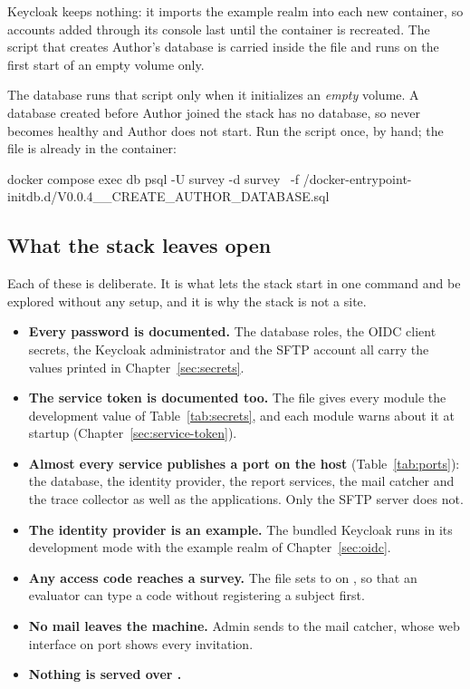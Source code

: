 \documentclass[11pt, a4paper]{article}
\begin{document}
Keycloak keeps nothing: it imports the example realm into each new container, so accounts
added through its console last until the container is recreated. The script that creates
Author's  database is carried inside the file and runs on the first start of an
empty  volume only.

\begin{elicitcaution}
The database runs that script only when it initializes an \emph{empty} volume. A database
created before Author joined the stack has no  database, so 
never becomes healthy and Author does not start. Run the script once, by hand; the file is
already in the container:

\begin{elicitcmd}
docker compose exec db psql -U survey -d survey \
  -f /docker-entrypoint-initdb.d/V0.0.4__CREATE_AUTHOR_DATABASE.sql
\end{elicitcmd}
\end{elicitcaution}

\subsection{What the stack leaves open}
\label{sec:compose-open}

Each of these is deliberate. It is what lets the stack start in one command and be explored
without any setup, and it is why the stack is not a site.

\begin{itemize}
  \item \textbf{Every password is documented.} The database roles, the OIDC client secrets, the
        Keycloak administrator and the SFTP account all carry the values printed in
        Chapter~\ref{sec:secrets}.
  \item \textbf{The service token is documented too.} The file gives every module the
        development value of Table~\ref{tab:secrets}, and each module warns about it at
        startup (Chapter~\ref{sec:service-token}).
  \item \textbf{Almost every service publishes a port on the host} (Table~\ref{tab:ports}):
        the database, the identity provider, the report services, the mail catcher and the
        trace collector as well as the applications. Only the SFTP server does not.
  \item \textbf{The identity provider is an example.} The bundled Keycloak runs in its
        development mode with the example realm of Chapter~\ref{sec:oidc}.
  \item \textbf{Any access code reaches a survey.} The file sets
        \opt{accessCode.autoRegister} to \val{true} on , so that an evaluator can
        type a code without registering a subject first.
  \item \textbf{No mail leaves the machine.} Admin sends to the mail catcher, whose web
        interface on port \val{8025} shows every invitation.
  \item \textbf{Nothing is served over .}
\end{itemize}
\end{document}
